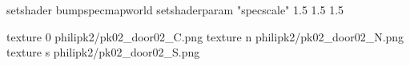 setshader bumpspecmapworld
setshaderparam "specscale" 1.5 1.5 1.5

texture 0 philipk2/pk02_door02_C.png
texture n philipk2/pk02_door02_N.png
texture s philipk2/pk02_door02_S.png


